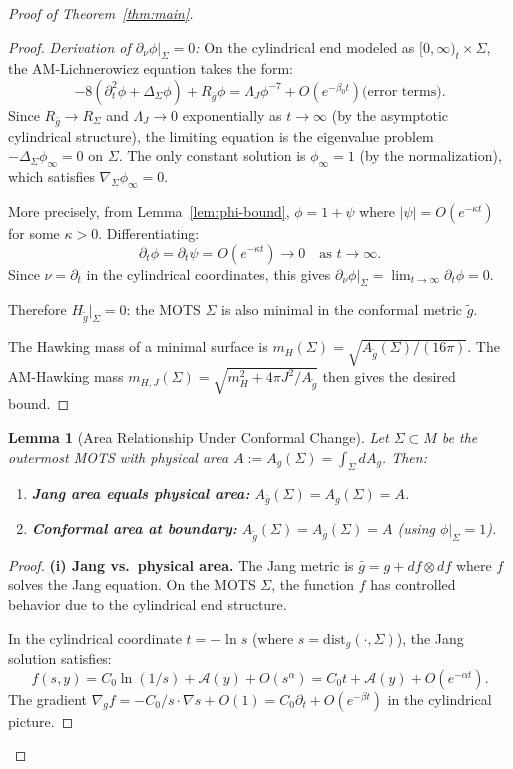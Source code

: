 \documentclass[12pt]{article}
\theoremstyle{plain}
\newtheorem{lemma}[theorem]{Lemma}
\theoremstyle{definition}
\theoremstyle{remark}
\newcommand{\tg}{\tilde{g}}
\newcommand{\bg}{\bar{g}}
\begin{document}
\begin{proof}[Proof of Theorem~\ref{thm:main}]
\begin{proof}
\textit{Derivation of $\partial_\nu\phi|_\Sigma = 0$:} On the cylindrical end modeled as $[0,\infty)_t \times \Sigma$, the AM-Lichnerowicz equation takes the form:
\[
-8\left(\partial_t^2\phi + \Delta_\Sigma\phi\right) + R_{\bg}\phi = \Lambda_J \phi^{-7} + O(e^{-\beta_0 t})\text{(error terms)}.
\]
Since $R_{\bg} \to R_\Sigma$ and $\Lambda_J \to 0$ exponentially as $t \to \infty$ (by the asymptotic cylindrical structure), the limiting equation is the eigenvalue problem $-\Delta_\Sigma\phi_\infty = 0$ on $\Sigma$. The only constant solution is $\phi_\infty = 1$ (by the normalization), which satisfies $\nabla_\Sigma\phi_\infty = 0$.

More precisely, from Lemma~\ref{lem:phi-bound}, $\phi = 1 + \psi$ where $|\psi| = O(e^{-\kappa t})$ for some $\kappa > 0$. Differentiating:
\[
\partial_t\phi = \partial_t\psi = O(e^{-\kappa t}) \to 0 \quad \text{as } t \to \infty.
\]
Since $\nu = \partial_t$ in the cylindrical coordinates, this gives $\partial_\nu\phi|_\Sigma = \lim_{t \to \infty}\partial_t\phi = 0$.

Therefore $H_{\tg}|_\Sigma = 0$: the MOTS $\Sigma$ is also minimal in the conformal metric $\tg$.

The Hawking mass of a minimal surface is $m_H(\Sigma) = \sqrt{A_{\tg}(\Sigma)/(16\pi)}$. The AM-Hawking mass $m_{H,J}(\Sigma) = \sqrt{m_H^2 + 4\pi J^2/A_{\tg}}$ then gives the desired bound.
\end{proof}

\begin{lemma}[Area Relationship Under Conformal Change]\label{lem:area-conformal}
Let $\Sigma \subset M$ be the outermost MOTS with physical area $A := A_g(\Sigma) = \int_\Sigma dA_g$. Then:
\begin{enumerate}[label=\textup{(\roman*)}]
    \item \textbf{Jang area equals physical area:} $A_{\bg}(\Sigma) = A_g(\Sigma) = A$.
    \item \textbf{Conformal area at boundary:} $A_{\tg}(\Sigma) = A_{\bg}(\Sigma) = A$ (using $\phi|_\Sigma = 1$).
\end{enumerate}
\end{lemma}

\begin{proof}
\textbf{(i) Jang vs.\ physical area.}
The Jang metric is $\bg = g + df \otimes df$ where $f$ solves the Jang equation. On the MOTS $\Sigma$, the function $f$ has controlled behavior due to the cylindrical end structure.

In the cylindrical coordinate $t = -\ln s$ (where $s = \mathrm{dist}_g(\cdot, \Sigma)$), the Jang solution satisfies:
\[
f(s, y) = C_0 \ln(1/s) + \mathcal{A}(y) + O(s^\alpha) = C_0 t + \mathcal{A}(y) + O(e^{-\alpha t}).
\]
The gradient $\nabla_g f = -C_0/s \cdot \nabla s + O(1) = C_0 \partial_t + O(e^{-\beta t})$ in the cylindrical picture.


\end{proof}
\end{proof}
\end{document}
